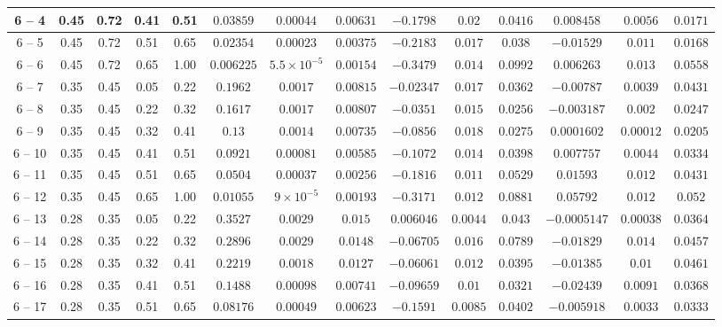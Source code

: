 \begin{longtable}{|*{14}{c|}}
\hline
6 -- 4 & 0.45 & 0.72 & 0.41 & 0.51 & $0.03859$ & $0.00044$ & $0.00631$ & $-0.1798$ & $0.02$ & $0.0416$ & $0.008458$ & $0.0056$ & $0.0171$ \\
\hline
6 -- 5 & 0.45 & 0.72 & 0.51 & 0.65 & $0.02354$ & $0.00023$ & $0.00375$ & $-0.2183$ & $0.017$ & $0.038$ & $-0.01529$ & $0.011$ & $0.0168$ \\
\hline
6 -- 6 & 0.45 & 0.72 & 0.65 & 1.00 & $0.006225$ & $5.5\times 10^{-5}$ & $0.00154$ & $-0.3479$ & $0.014$ & $0.0992$ & $0.006263$ & $0.013$ & $0.0558$ \\
\hline
6 -- 7 & 0.35 & 0.45 & 0.05 & 0.22 & $0.1962$ & $0.0017$ & $0.00815$ & $-0.02347$ & $0.017$ & $0.0362$ & $-0.00787$ & $0.0039$ & $0.0431$ \\
\hline
6 -- 8 & 0.35 & 0.45 & 0.22 & 0.32 & $0.1617$ & $0.0017$ & $0.00807$ & $-0.0351$ & $0.015$ & $0.0256$ & $-0.003187$ & $0.002$ & $0.0247$ \\
\hline
6 -- 9 & 0.35 & 0.45 & 0.32 & 0.41 & $0.13$ & $0.0014$ & $0.00735$ & $-0.0856$ & $0.018$ & $0.0275$ & $0.0001602$ & $0.00012$ & $0.0205$ \\
\hline
6 -- 10 & 0.35 & 0.45 & 0.41 & 0.51 & $0.0921$ & $0.00081$ & $0.00585$ & $-0.1072$ & $0.014$ & $0.0398$ & $0.007757$ & $0.0044$ & $0.0334$ \\
\hline
6 -- 11 & 0.35 & 0.45 & 0.51 & 0.65 & $0.0504$ & $0.00037$ & $0.00256$ & $-0.1816$ & $0.011$ & $0.0529$ & $0.01593$ & $0.012$ & $0.0431$ \\
\hline
6 -- 12 & 0.35 & 0.45 & 0.65 & 1.00 & $0.01055$ & $9\times 10^{-5}$ & $0.00193$ & $-0.3171$ & $0.012$ & $0.0881$ & $0.05792$ & $0.012$ & $0.052$ \\
\hline
6 -- 13 & 0.28 & 0.35 & 0.05 & 0.22 & $0.3527$ & $0.0029$ & $0.015$ & $0.006046$ & $0.0044$ & $0.043$ & $-0.0005147$ & $0.00038$ & $0.0364$ \\
\hline
6 -- 14 & 0.28 & 0.35 & 0.22 & 0.32 & $0.2896$ & $0.0029$ & $0.0148$ & $-0.06705$ & $0.016$ & $0.0789$ & $-0.01829$ & $0.014$ & $0.0457$ \\
\hline
6 -- 15 & 0.28 & 0.35 & 0.32 & 0.41 & $0.2219$ & $0.0018$ & $0.0127$ & $-0.06061$ & $0.012$ & $0.0395$ & $-0.01385$ & $0.01$ & $0.0461$ \\
\hline
6 -- 16 & 0.28 & 0.35 & 0.41 & 0.51 & $0.1488$ & $0.00098$ & $0.00741$ & $-0.09659$ & $0.01$ & $0.0321$ & $-0.02439$ & $0.0091$ & $0.0368$ \\
\hline
6 -- 17 & 0.28 & 0.35 & 0.51 & 0.65 & $0.08176$ & $0.00049$ & $0.00623$ & $-0.1591$ & $0.0085$ & $0.0402$ & $-0.005918$ & $0.0033$ & $0.0333$ \\

\end{longtable}
